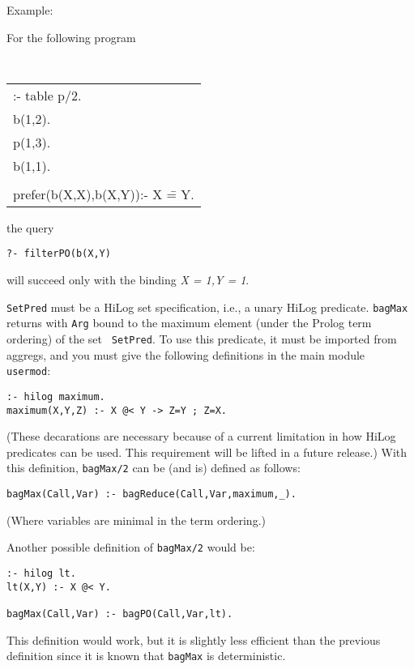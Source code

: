 \begin{description}
Example:

For the following program
     \begin{center}
     {\tt
     \begin{tabular}{l}
          :- table p/2.	\\
          b(1,2).       \\
          p(1,3).       \\
          b(1,1).       \\
\\
	  prefer(b(X,X),b(X,Y)):- X \== Y. 
     \end{tabular}
     }
     \end{center}
the query 
\begin{center}
{\tt ?- filterPO(b(X,Y)}
\end{center}
will succeed only with the binding {\em X = 1,Y = 1}.

%
    {\tt SetPred} must be a HiLog set specification, i.e., a unary
    HiLog predicate.  {\tt bagMax} returns with {\tt Arg} bound to the
    maximum element (under the Prolog term ordering) of the set {\tt
    SetPred}.  To use this predicate, it must be imported from aggregs,
    and you must give the following definitions in the main module {\tt
    usermod}:
\begin{verbatim}
:- hilog maximum.
maximum(X,Y,Z) :- X @< Y -> Z=Y ; Z=X.
\end{verbatim}
    (These decarations are necessary because of a current limitation in
    how HiLog predicates can be used.  This requirement will be lifted in
    a future release.)  With this definition, {\tt bagMax/2} can be (and
    is) defined as follows:
\begin{verbatim}
bagMax(Call,Var) :- bagReduce(Call,Var,maximum,_).
\end{verbatim}
    (Where variables are minimal in the term ordering.)

Another possible definition of {\tt bagMax/2} would be:
\begin{verbatim}
:- hilog lt.
lt(X,Y) :- X @< Y.

bagMax(Call,Var) :- bagPO(Call,Var,lt).
\end{verbatim}
This definition would work, but it is slightly less efficient than the
previous definition since it is known that {\tt bagMax} is
deterministic.


\end{description}

